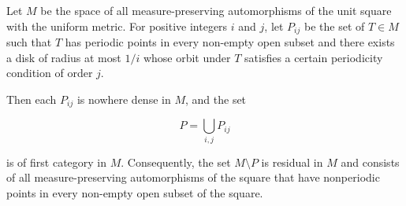 Let $M$ be the space of all measure-preserving automorphisms of the unit square with the uniform metric. For positive integers $i$ and $j$, let $P_{ij}$ be the set of $T \in M$ such that $T$ has periodic points in every non-empty open subset and there exists a disk of radius at most $1/i$ whose orbit under $T$ satisfies a certain periodicity condition of order $j$.

Then each $P_{ij}$ is nowhere dense in $M$, and the set

$$P = \bigcup_{i,j} P_{ij}$$

is of first category in $M$. Consequently, the set $M \setminus P$ is residual in $M$ and consists of all measure-preserving automorphisms of the square that have nonperiodic points in every non-empty open subset of the square.
